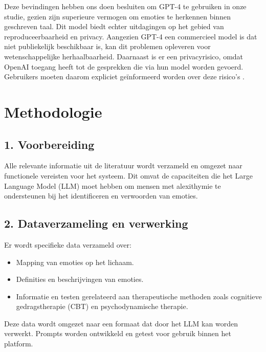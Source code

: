 Deze bevindingen hebben ons doen besluiten om GPT-4 te gebruiken in onze studie, gezien zijn superieure vermogen om emoties te herkennen binnen geschreven taal. Dit model biedt echter uitdagingen op het gebied van reproduceerbaarheid en privacy. Aangezien GPT-4 een commercieel model is dat niet publiekelijk beschikbaar is, kan dit problemen opleveren voor wetenschappelijke herhaalbaarheid. Daarnaast is er een privacyrisico, omdat OpenAI toegang heeft tot de gesprekken die via hun model worden gevoerd. Gebruikers moeten daarom expliciet geïnformeerd worden over deze risico's \autocite{Patel2023}.




\section{Methodologie}%
\label{sec:methodologie}

\subsection{1. Voorbereiding}
Alle relevante informatie uit de literatuur wordt verzameld en omgezet naar functionele vereisten voor het systeem. Dit omvat de capaciteiten die het Large Language Model (LLM) moet hebben om mensen met alexithymie te ondersteunen bij het identificeren en verwoorden van emoties.

\subsection{2. Dataverzameling en verwerking}
Er wordt specifieke data verzameld over:
\begin{itemize}
  \item Mapping van emoties op het lichaam.
  \item Definities en beschrijvingen van emoties.
  \item Informatie en testen gerelateerd aan therapeutische methoden zoals cognitieve gedragstherapie (CBT) en psychodynamische therapie.
\end{itemize}
Deze data wordt omgezet naar een formaat dat door het LLM kan worden verwerkt. Prompts worden ontwikkeld en getest voor gebruik binnen het platform.


